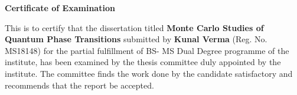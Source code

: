 \documentclass[a4paper,12pt]{report}
\numberwithin{equation}{section}
\begin{document}

  



\newpage
\thispagestyle{empty}
\mbox{}
\newpage

\begin{center}
    \textsf{\textbf{\Large Certificate of Examination}} 
\end{center}
\vspace*{1em}

This is to certify that the dissertation titled \textbf{Monte Carlo Studies of Quantum Phase Transitions} submitted by \textbf{Kunal Verma} (Reg. No. MS18148) for the partial fulfillment of BS- MS Dual Degree programme of the institute, has been examined by the thesis committee duly appointed by the institute. The committee finds the work done by the candidate satisfactory and recommends that the report be accepted.

\vspace{4cm}
\end{document}
